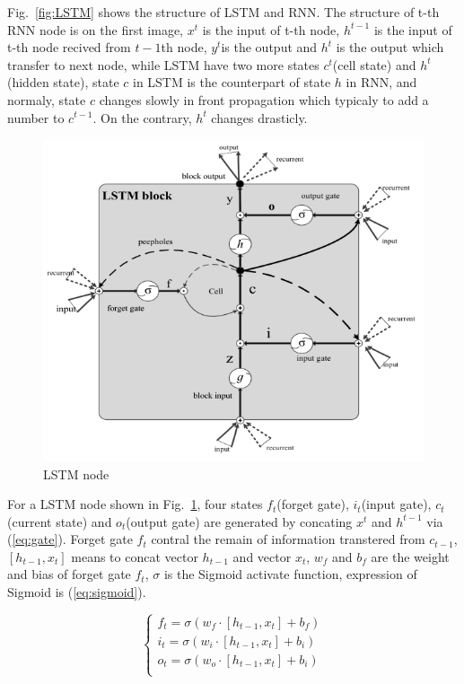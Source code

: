 \documentclass[conference]{IEEEtran}
\begin{document}
Fig.~\ref{fig:LSTM} shows the structure of LSTM and RNN. The structure of t-th RNN node is on the first image, $x^t$ is the input of t-th node, $h^{t-1}$ is the input of t-th node recived from $t-1$th node, $y^t$is the output and $h^t$ is the output which transfer to next node, while LSTM have two more states $c^t$(cell state) and $h^t$(hidden state), state $c$ in LSTM is the counterpart of state $h$ in RNN, and normaly, state $c$ changes slowly in front propagation which typicaly to add a number to $c^{t-1}$. On the contrary, $h^t$ changes drasticly.

\begin{figure}[htbp]
  \centerline{\includegraphics[width=0.7\linewidth]{figures/LSTM_node.png}}
  \caption{LSTM node}
  \label{fig:LSTM2}
\end{figure}

For a LSTM node shown in Fig.~\ref{fig:LSTM2}, four states $f_t$(forget gate), $i_t$(input gate), $c_t$(current state) and $o_t$(output gate) are generated by concating $x^t$ and $h^{t-1}$ via (\ref{eq:gate}). Forget gate $f_t$ contral the remain of information transtered from $c_{t-1}$, $[h_{t-1}, x_t]$  means to concat vector $h_{t-1}$ and vector $x_t$, $w_f$ and $b_f$ are the weight and bias of forget gate $f_t$, $\sigma$ is the Sigmoid activate function, expression of Sigmoid is (\ref{eq:sigmoid}).

\begin{equation}
  \begin{cases}	f_t=\sigma \left( w_f\cdot \left[ h_{t-1},x_t \right] +b_f \right)\\	i_t=\sigma \left( w_i\cdot \left[ h_{t-1},x_t \right] +b_i \right)\\	o_t=\sigma \left( w_o\cdot \left[ h_{t-1},x_t \right] +b_i \right)\\\end{cases}
  \label{eq:gate}
\end{equation}
\end{document}
